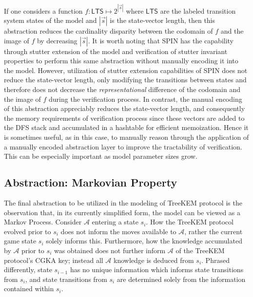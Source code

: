 \documentclass[runningheads]{llncs}
\newcommand{\Adversary}{\ensuremath{\mathcal{A}}\xspace}
\begin{document}
If one considers a function $f: \mathsf{LTS} \mapsto 2^{\left|\vec{s}\right|}$ where $\mathsf{LTS}$ are the labeled transition system states of the model and $\left|\vec{s}\right|$ is the state-vector length, then this abstraction reduces the cardinality disparity between the codomain of $f$ and the image of $f$ by decreasing $\left|\vec{s}\right|$.  
It is worth noting that SPIN has the capability through stutter extension of the model and verification of stutter invariant properties to perform this same abstraction without manually encoding it into the model.
However, utilization of stutter extension capabilities of SPIN does not reduce the state-vector length, only modifying the transitions between states and therefore does not decrease the \emph{representational} difference of the codomain and the image of $f$ during the verification process.
In contrast, the manual encoding of this abstraction appreciably reduces the state-vector length, and consequently the memory requirements of verification process since these vectors are added to the DFS stack and accumulated in a hashtable for efficient memoization.
Hence it is sometimes useful, as in this case, to manually reason through the application of a manually encoded abstraction layer to improve the tractability of verification.
This can be especially important as model parameter sizes grow.


\subsection{Abstraction: Markovian Property}

The final abstraction to be utilized in the modeling of TreeKEM protocol is the observation that, in its currently simplified form, the model can be viewed as a Markov Process.
Consider \Adversary entering a \CGKAsec state $s_{i}$.
How the TreeKEM protocol evolved prior to $s_{i}$ does not inform the moves available to \Adversary, rather the current game state $s_{i}$ solely informs this.
Furthermore, how the knowledge accumulated by \Adversary prior to $s_{i}$ was obtained does not further inform \Adversary of the TreeKEM protocol's CGKA key; instead all \Adversary knowledge is deduced from $s_{i}$.
Phrased differently, state $s_{i-1}$ has no unique information which informs state transitions from $s_{i}$, and state transitions from $s_{i}$ are determined solely from the information contained within $s_{i}$.
\end{document}
